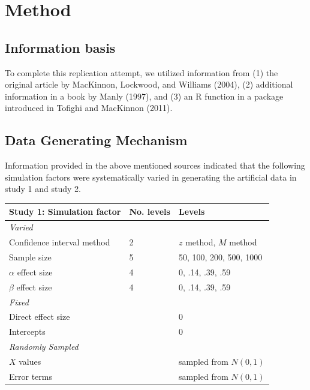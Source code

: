 \documentclass[10,a4paperpaper,]{article}
\begin{document}
\section{Method}

\subsection{Information basis}

To complete this replication attempt, we utilized information from (1)
the original article by MacKinnon, Lockwood, and Williams (2004), (2)
additional information in a book by Manly (1997), and (3) an R function
in a package introduced in Tofighi and MacKinnon (2011).

\subsection{Data Generating Mechanism}

Information provided in the above mentioned sources indicated that the
following simulation factors were systematically varied in generating
the artificial data in study 1 and study 2.

\begin{longtable}[]{@{}lll@{}}
\toprule
Study 1: Simulation factor & No. levels & Levels\tabularnewline
\midrule
\endhead
\emph{Varied} & &\tabularnewline
Confidence interval method & 2 & \(z\) method, \(M\)
method\tabularnewline
Sample size & 5 & 50, 100, 200, 500, 1000\tabularnewline
\(\alpha\) effect size & 4 & 0, .14, .39, .59\tabularnewline
\(\beta\) effect size & 4 & 0, .14, .39, .59\tabularnewline
\emph{Fixed} & &\tabularnewline
Direct effect size & & 0\tabularnewline
Intercepts & & 0\tabularnewline
\emph{Randomly Sampled} & &\tabularnewline
\(X\) values & & sampled from \(N(0,1)\)\tabularnewline
Error terms & & sampled from \(N(0,1)\)\tabularnewline
\bottomrule
\end{longtable}
\end{document}
